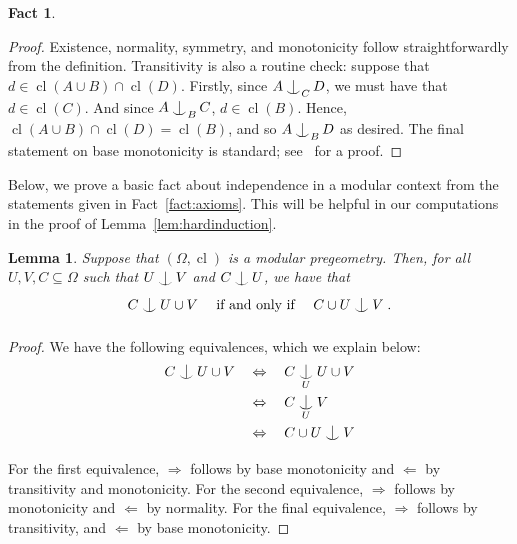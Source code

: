 \documentclass{article}
\newtheorem{lemma}[theorem]{Lemma}
\newtheorem{fact}[theorem]{Fact}
\theoremstyle{remark}
\theoremstyle{definition}
\def\acts{\curvearrowright}
\newcommand{\indep}[2]{%
  \mathrel{
    \mathop{
      \vcenter{
        \hbox{\oalign{\noalign{\kern-.3ex}\hfil$\vert$\rlap{$^\mathrm{#2}$}\hfil\cr
              \noalign{\kern-.7ex}
              $\smile$\cr\noalign{\kern-.3ex}}}
      }
    }\displaylimits_{#1}
  }
}
\DeclareMathOperator{\cl}{cl}
\def\Ind#1#2{#1\setbox0=\hbox{$#1x$}\kern\wd0\hbox to 0pt{\hss$#1\mid$\hss}
	\lower.9\ht0\hbox to 0pt{\hss$#1\smile$\hss}\kern\wd0}
\def\ind{\mathop{\mathpalette\Ind{}}}
\begin{document}
{{\begin{fact}
\end{fact}
\begin{proof}
   {Existence, normality, symmetry, and monotonicity follow straightforwardly from the definition. Transitivity is also a routine check: suppose that $d\in\cl(A\cup B)\cap\cl(D)$. Firstly, since $A\ind_C D$, we must have that $d\in\cl(C)$. And since $A\ind_B C$,  $d\in\cl(B)$. Hence, $\cl(A\cup B)\cap \cl(D)=\cl(B)$, and so $A\ind_B D$ as desired. The final statement %
    on base monotonicity is standard; see~\cite[Proposition 1.2.12]{d2023axiomatic} for a proof.}
\end{proof}
Below, we prove a basic fact about %
{independence} in a modular context from the statements given in Fact~\ref{fact:axioms}. This will be helpful in our computations in the proof of Lemma~\ref{lem:hardinduction}. 
\begin{lemma}\label{lem:modularmoving} Suppose that {$(\Omega, \cl)$} is a modular pregeometry. {Then, for all $U,V,C\subseteq \Omega$ such that  $U\ind V$ and $C\ind U$}, we have that
 \[C\indep{}{} U\cup V\quad \text{ if and only if }\quad  C\cup U\indep{}{} V\;.\]
\end{lemma}
\begin{proof}  We have the following equivalences, which we explain below:
\begin{align}
        C\indep{}{} U\cup V\quad & \Leftrightarrow\quad  C\indep{U}{} U\cup V \\
        &\Leftrightarrow\quad  C\indep{U}{} V \\ 
         & \Leftrightarrow\quad  C\cup U\indep{}{} V 
    \end{align}   
   For the first equivalence, $\Rightarrow$ follows by base monotonicity and $\Leftarrow$ by transitivity and monotonicity. For the second equivalence, $\Rightarrow$ follows by monotonicity and $\Leftarrow$ by normality. For the final equivalence, $\Rightarrow$ follows by transitivity, and $\Leftarrow $ by {base monotonicity}.
\end{proof}

}}
\end{document}
